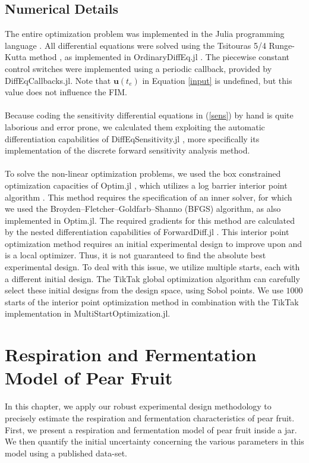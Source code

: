 \subsection{Numerical Details}
The entire optimization problem was implemented in the Julia programming language \parencite{bezanson}. 
All differential equations were solved using the Tsitouras 5/4 Runge-Kutta method \parencite{tsitouras}, as implemented in OrdinaryDiffEq.jl \parencite{rackauckas}. The piecewise constant control switches were implemented using a periodic callback, provided by DiffEqCallbacks.jl. Note that $\bm u(t_e)$ in Equation \ref{input} is undefined, but this value does not influence the FIM.
\\
\\
Because coding the sensitivity differential equations in (\ref{sens}) by hand is quite laborious and error prone, we calculated them exploiting the automatic differentiation capabilities of DiffEqSensitivity.jl \parencite{rackauckas2}, more specifically its implementation of the discrete forward sensitivity analysis method.
\\
\\
To solve the non-linear optimization problems, we used the box constrained optimization capacities of Optim.jl \parencite{mogensen}, which utilizes a log barrier interior point algorithm \parencite{nocedal}. This method requires the specification of an inner solver, for which we used the Broyden–Fletcher–Goldfarb–Shanno (BFGS) algorithm, as also implemented in Optim.jl. The required gradients for this method are calculated by the nested differentiation capabilities of ForwardDiff.jl \parencite{revels}. This interior point optimization method requires an initial experimental design to improve upon and is a local optimizer. Thus, it is not guaranteed to find the absolute best experimental design. To deal with this issue, we utilize multiple starts, each with a different initial design. The TikTak global optimization algorithm \parencite{arnoud} can carefully select these initial designs from the design space, using Sobol points. We use $1000$ starts of the interior point optimization method in combination with the TikTak implementation in MultiStartOptimization.jl.
\section{Respiration and Fermentation Model of Pear Fruit}
In this chapter, we apply our robust experimental design methodology to  precisely estimate the respiration and fermentation characteristics of pear fruit. First, we present a respiration and fermentation model of pear fruit inside a jar. We then quantify the initial uncertainty concerning the various parameters in this model using a published data-set.
\label{sec_pear}
